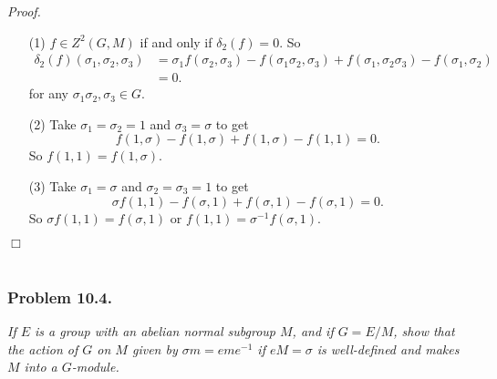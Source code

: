 \documentclass{article}
\begin{document}
\emph{Proof.}
\begin{enumerate}
\item[(1)]
  $f \in Z^2(G,M)$ if and only if $\delta_2(f) = 0$.
  So
  \begin{align*}
    \delta_2(f)(\sigma_1, \sigma_2, \sigma_3)
    &= \sigma_1 f(\sigma_2, \sigma_3)
        - f(\sigma_1\sigma_2,\sigma_3)
        + f(\sigma_1, \sigma_2\sigma_3)
        - f(\sigma_1, \sigma_2) \\
    &= 0.
  \end{align*}
  for any $\sigma_1 \sigma_2, \sigma_3 \in G$.

\item[(2)]
  Take $\sigma_1 = \sigma_2 = 1$ and $\sigma_3 = \sigma$ to get
  \[
    f(1,\sigma) - f(1,\sigma) + f(1,\sigma) - f(1,1) = 0.
  \]
  So $f(1,1) = f(1,\sigma)$.

\item[(3)]
  Take $\sigma_1 = \sigma$ and $\sigma_2 = \sigma_3 = 1$ to get
  \[
    \sigma f(1,1) - f(\sigma,1) + f(\sigma,1) - f(\sigma,1) = 0.
  \]
  So $\sigma f(1,1) = f(\sigma,1)$ or $f(1,1) = \sigma^{-1}f(\sigma,1)$.
\end{enumerate}
$\Box$ \\\\






\subsubsection*{Problem 10.4.}
\emph{If $E$ is a group with an abelian normal subgroup $M$,
and if $G = E/M$,
show that the action of $G$ on $M$ given by $\sigma m = eme^{-1}$ if
$eM = \sigma$ is well-defined and makes $M$ into a $G$-module.} \\
\end{document}
